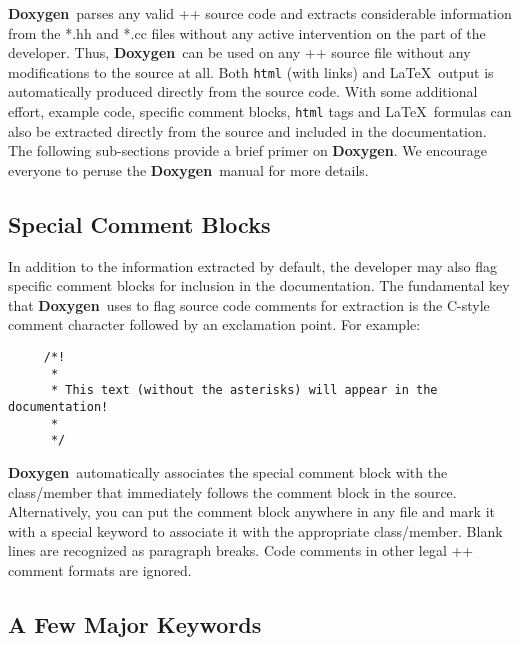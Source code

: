 \documentclass[11pt]{ResearchNote}
\newcommand{\doxy}{{\normalfont\bfseries Doxygen}}
\begin{document}
\doxy\ parses any valid \C++ source code and extracts considerable 
information from the *.hh
and *.cc files without any active intervention on the part of the developer.
Thus, \doxy\ can be used on any \C++ source file
without any modifications to the source at all. 
Both \texttt{html} (with links)
and \LaTeX\ output is automatically produced directly from the source code.
With some additional effort, example code, specific comment blocks, \texttt{html}
 tags and \LaTeX\
formulas can also be extracted directly from the source
and included in the documentation.  The following
sub-sections provide a brief primer on \doxy. We encourage everyone to peruse
the \doxy\ manual for more details.

\subsection{Special Comment Blocks}
\label{sec:spcom}

In addition to the information extracted by default,
the developer may also flag specific
comment blocks for inclusion in the documentation.
The fundamental key that \doxy\ uses to flag source code comments for
extraction is the C-style comment character followed by an exclamation
point. For example:
\begin{verbatim}
     /*!
      *
      * This text (without the asterisks) will appear in the documentation!
      *
      */
\end{verbatim}
\doxy\ automatically associates
the special comment block with the class/member that immediately follows the 
comment block in the source. Alternatively, you can put the comment block
anywhere in any file and mark it with a special keyword to associate it
with the appropriate class/member. Blank lines are recognized as paragraph
breaks. Code comments in other legal \C++ comment formats are ignored.

\subsection{A Few Major Keywords}
\end{document}
